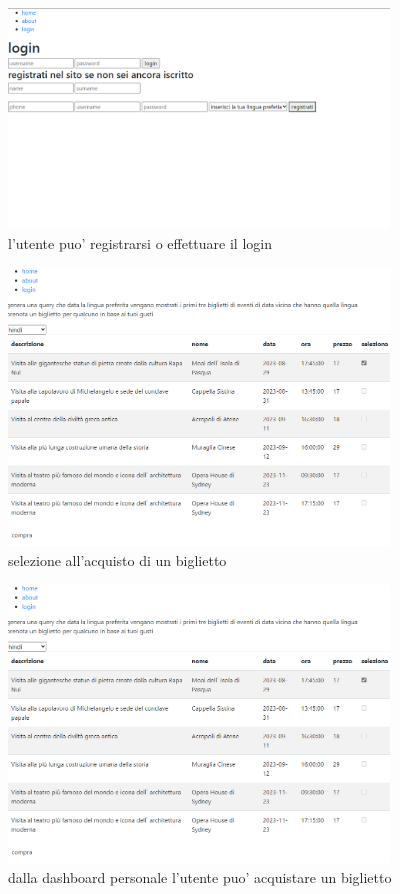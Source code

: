 \documentclass[a4paper,12pt]{report}
\begin{document}
\begin{figure}[H]
	\centering
	\includegraphics[width=0.9\textwidth]{../resources/img/login.png}
	\caption{l'utente puo' registrarsi o effettuare il login}
	\label{fig:registrazione}
\end{figure}
\begin{figure}
	\centering
	\includegraphics[width=0.9\textwidth]{../resources/img/dashboard.png}
	\caption{selezione all'acquisto di un biglietto}
	\label{fig:dashBoard}
\end{figure}
\begin{figure}
	\centering
	\includegraphics[width=0.9\textwidth]{../resources/img/dashboard.png}
	\caption{dalla dashboard personale l'utente puo' acquistare un biglietto}
	\label{fig:ordine}
\end{figure}
\appendix
\end{document}
